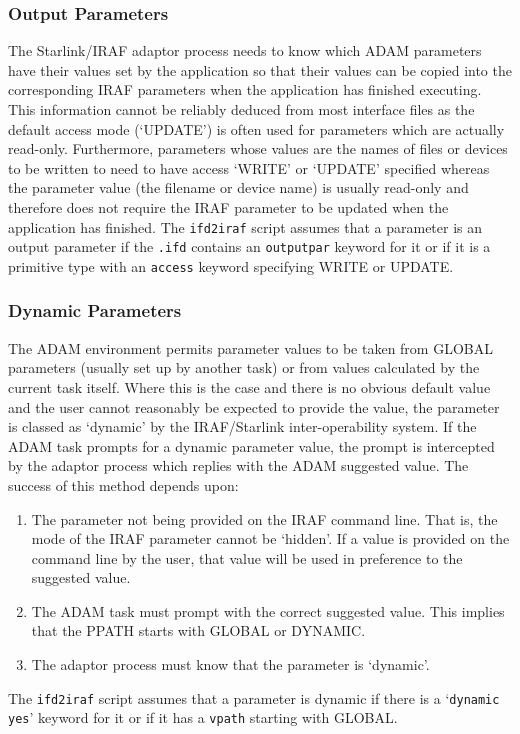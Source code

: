 \documentclass[twoside,11pt]{article}
\newcommand{\xref}[3]{#1}
\newcommand{\xlabel}[1]{}
\begin{document}
\subsubsection{\xlabel{output_parameters}Output Parameters}
The Starlink/IRAF adaptor process needs to know which ADAM parameters have
their values set by the application so that their values can be copied
into the corresponding IRAF parameters when the application has finished
executing. This information cannot be reliably deduced from most interface
files as the default access mode (`UPDATE') is often used for parameters which
are actually read-only.
Furthermore, parameters whose values are the names of files or devices to be
written to need to have access `WRITE' or `UPDATE' specified whereas the
parameter value (the filename or device name) is usually read-only and 
therefore does not require the IRAF parameter to be updated when the 
application has finished.
The 
\xref{\texttt{ifd2iraf}}{ssn68}{producing_iraf_files_from_an_ifd} 
script assumes that a parameter is an output parameter
if the \texttt{.ifd} contains an
\xref{\texttt{outputpar}}{ssn68}{outputpar}
keyword for it or if it is a primitive type with an 
\xref{\texttt{access}}{ssn68}{access}
keyword specifying WRITE or UPDATE.

\subsubsection{\xlabel{dynamic_parameters}\label{dynamic_parameters}Dynamic 
Parameters}
The ADAM environment permits parameter values to be taken from GLOBAL
parameters (usually set up by another task) or from values calculated by the 
current task itself. Where this is the case and there is no obvious default 
value and the user cannot reasonably be expected to provide the value, the 
parameter is classed as `dynamic' by the IRAF/Starlink inter-operability
system. If the ADAM task prompts for a dynamic parameter value, the prompt
is intercepted by the adaptor process which replies with the ADAM suggested
value. The success of this method depends upon:
\begin{enumerate}
\item The parameter not being provided on the IRAF command line. That is,
the mode of the IRAF parameter cannot be `hidden'. If a value is provided on
the command line by the user, that value will be used in preference to the
suggested value.
\item The ADAM task must prompt with the correct suggested value. This implies
that the PPATH starts with GLOBAL or DYNAMIC.
\item The adaptor process must know that the parameter is `dynamic'.
\end{enumerate}
The 
\xref{\texttt{ifd2iraf}}{ssn68}{producing_iraf_files_from_an_ifd} 
script assumes that a parameter is dynamic if there is a
\xref{`\texttt{dynamic yes}'}{ssn68}{dynamic}
keyword for it or if it has a
\xref{\texttt{vpath}}{ssn68}{vpath}
starting with GLOBAL.
\end{document}
